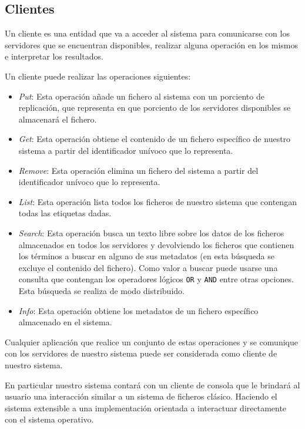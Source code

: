 \documentclass{article}
\begin{document}
\subsection{Clientes}

Un cliente es una entidad que va a acceder al sistema para comunicarse con los 
servidores que se encuentran disponibles, realizar alguna operación en los 
mismos e interpretar los resultados.

Un cliente puede realizar las operaciones siguientes:

\begin{itemize}
  \item \emph{Put}: Esta operación añade un fichero al sistema con
  un porciento de replicación, que representa en que porciento de los
  servidores disponibles se almacenará el fichero.
  
  \item \emph{Get}: Esta operación obtiene el contenido de un fichero específico
  de nuestro sistema a partir del identificador unívoco que lo representa.
  
  \item \emph{Remove}: Esta operación elimina un fichero del sistema a partir
  del identificador unívoco que lo representa.
  
  \item \emph{List}: Esta operación lista todos los ficheros de nuestro sistema
  que contengan todas las etiquetas dadas.
  
  \item \emph{Search}: Esta operación busca un texto libre sobre los datos
  de los ficheros almacenados en todos los servidores y devolviendo los
  ficheros que contienen los términos a buscar en alguno de sus metadatos (en
  esta búsqueda se excluye el contenido del fichero). Como valor a buscar puede
  usarse una consulta que contengan los operadores lógicos \verb|OR| y
  \verb|AND| entre otras opciones. Esta búsqueda se realiza de modo
  distribuido.
  
  \item \emph{Info}: Esta operación obtiene los metadatos de un fichero
  específico almacenado en el sistema.
\end{itemize}

Cualquier aplicación que realice un conjunto de estas operaciones y se
comunique con los servidores de nuestro sistema puede ser considerada como
cliente de nuestro sistema.

En particular nuestro sistema contará con un cliente de consola que le brindará
al usuario una interacción similar a un sistema de ficheros clásico. Haciendo
el sistema extensible a una implementación orientada a interactuar directamente
con el sistema operativo.
\end{document}
